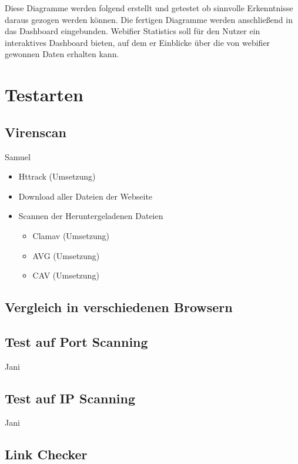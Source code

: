Diese Diagramme werden folgend erstellt und getestet ob sinnvolle Erkenntnisse daraus gezogen werden können. Die fertigen Diagramme werden anschließend in das Dashboard eingebunden. Webifier Statistics soll für den Nutzer ein interaktives Dashboard bieten, auf dem er Einblicke über die von webifier gewonnen Daten erhalten kann.

\section{Testarten}

\subsection{Virenscan}

\todo Samuel

\begin{itemize}
  \item Httrack (Umsetzung)
  \item Download aller Dateien der Webseite
  \item Scannen der Heruntergeladenen Dateien
  \begin{itemize}
    \item Clamav (Umsetzung)
    \item AVG (Umsetzung)
    \item CAV (Umsetzung)
  \end{itemize}
\end{itemize}

\subsection{Vergleich in verschiedenen Browsern}


\subsection{Test auf Port Scanning}

\todo Jani

\subsection{Test auf IP Scanning}

\todo Jani

\subsection{Link Checker}

